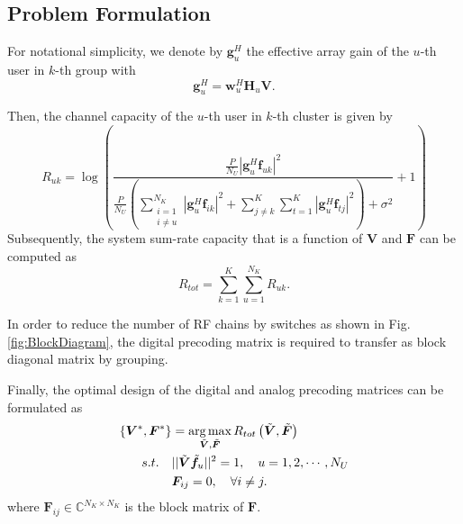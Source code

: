 \documentclass[conference]{IEEEtran}
\def\argmax{\mathop{\mbox{arg\,max}}}
\begin{document}
\subsection{Problem Formulation}

For notational simplicity, we denote by ${\bm{g}}_{u}^H$ the effective array gain of the $u$-th user in $k$-th group with
\begin{equation}\label{eq:defgu}
{\bm{g}}_{u}^H = \bm{w}^H_u \bm{H}_u \bm{V}.
\end{equation}




Then, the channel capacity of the $u$-th user in $k$-th cluster is given by 
\begin{equation}\label{eq:6}
R_{uk} = \log\left(\frac{\frac{P}{N_U}|\bm{g}^H_{u}\bm{f}_{uk}|^2}{\frac{P}{N_U}\left(\displaystyle\sum_{\substack{i=1 \\ i\neq u}}^{N_K}|{\bm{g}}_{u}^H\bm{f}_{ik}|^2 + \sum_{j\neq k}^K \sum_{t=1}^{K} |\bm{g}_{u}^H\bm{f}_{tj}|^2\right)+\sigma^2}+1\right)
\end{equation}
Subsequently, the system sum-rate capacity that is a function of ${\bm V}$ and ${\bm F}$ can be computed as
\begin{equation}
R_{tot}=\sum_{k=1}^{K}\sum_{u=1}^{N_K}R_{uk}.
\end{equation}

In order to reduce the number of RF chains by switches as shown in Fig. \ref{fig:BlockDiagram}, the digital precoding matrix is required to transfer as block diagonal matrix by grouping.

Finally, the optimal design of the digital and analog precoding matrices can be formulated as
\begin{align}\label{eq:maxsumrate}
\left\{{\bm V}^*,{\bm F}^*\right\} &= \argmax_{\tilde{\bm V},\tilde{\bm F}} R_{tot}\left(\tilde{\bm V},\tilde{\bm F}\right)\\ \nonumber
s.t. \quad&||\tilde{\bm V}\tilde{\bm f}_u||^2 = 1, \quad u=1,2,\cdots,N_U\\
& \bm{F}_{ij} = 0,\quad \forall i\neq j\nonumber.
\end{align}
where $\bm{F}_{ij}\in \mathbb{C}^{N_K\times N_K}$ is the block matrix of $\bm{F}$.
\end{document}
